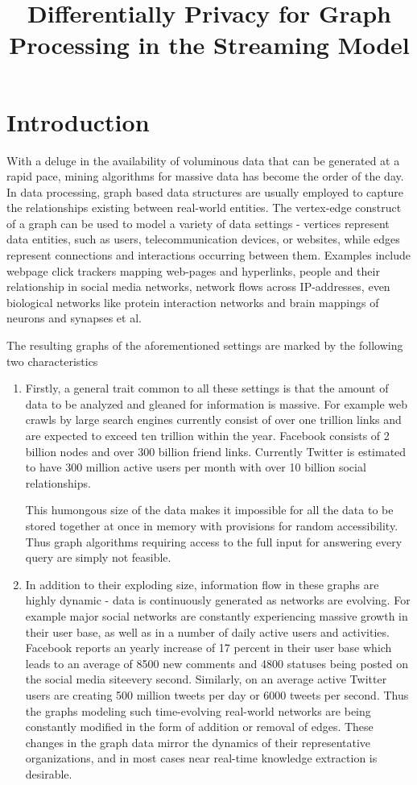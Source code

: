 \documentclass{article}
\title{Differentially Privacy for Graph Processing in the Streaming Model}
\date{}
\theoremstyle{definition}
\begin{document}
\maketitle{}
\section{Introduction} With a deluge in the availability of voluminous data that can be generated at a rapid pace,  mining algorithms for massive data has become the order of the day. In data processing, graph based data structures are usually employed to capture the relationships existing between real-world entities. The vertex-edge construct of a graph can be used to model a variety of data settings - vertices represent data  entities, such as users, telecommunication devices, or websites, while edges represent connections and interactions occurring between them. Examples include  webpage click trackers mapping web-pages and hyperlinks, people and their relationship in social media networks, network flows across IP-addresses, even biological networks like protein interaction networks and brain mappings of neurons and synapses et al. 
\par The resulting graphs of the aforementioned settings are marked by the following two characteristics 
\begin{enumerate}\item Firstly, a  general trait common to all these settings is that the amount of data to be analyzed and gleaned for information is massive. For example  web crawls by large search engines currently consist of over one trillion links and are expected to exceed ten trillion within the year. %
Facebook consists of 2 billion nodes and over 300 billion friend links. 
Currently Twitter is estimated to have 300 million active users per month with over 10 billion social relationships. 


This humongous size of the data makes it impossible for all the data to be stored together at once in memory with  provisions for random accessibility. Thus graph algorithms requiring access to the full input for answering every query are simply not feasible.

  \item In addition to their exploding size, information flow in these graphs are highly dynamic - data is continuously generated as networks are evolving. For example major social networks are constantly experiencing massive growth in their user base, as well as in a number of daily active users and activities. Facebook reports an  yearly increase of 17 percent in their user base which leads to an average of 8500 new comments and 4800 statuses being posted on the  social media siteevery second. Similarly, on an average active Twitter users are creating 500 million tweets per day or 6000 tweets per second. Thus the graphs modeling such time-evolving real-world networks are being constantly modified in the form of addition or removal of edges. These changes in the graph data mirror the dynamics of their representative organizations, and in most cases near real-time knowledge extraction is desirable.
 \end{enumerate}
\end{document}
